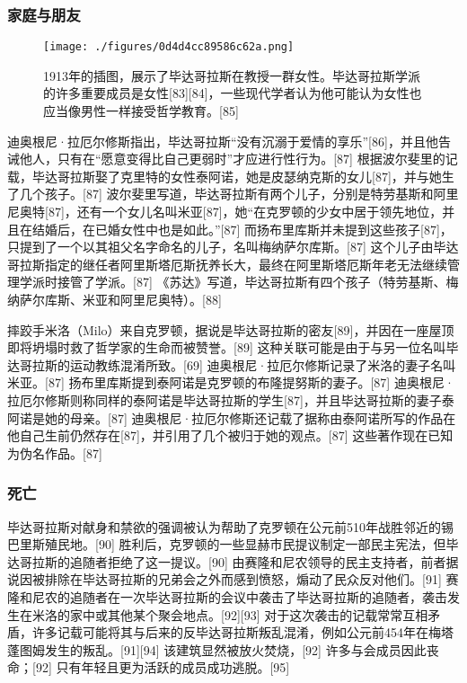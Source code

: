 \subsubsection{家庭与朋友}
\begin{figure}[ht]
\centering
\texttt{[image: ./figures/0d4d4cc89586c62a.png]}
\caption{1913年的插图，展示了毕达哥拉斯在教授一群女性。毕达哥拉斯学派的许多重要成员是女性[83][84]，一些现代学者认为他可能认为女性也应当像男性一样接受哲学教育。[85]} \label{fig_Pythag_6}
\end{figure}
迪奥根尼·拉厄尔修斯指出，毕达哥拉斯“没有沉溺于爱情的享乐”[86]，并且他告诫他人，只有在“愿意变得比自己更弱时”才应进行性行为。[87] 根据波尔斐里的记载，毕达哥拉斯娶了克里特的女性泰阿诺，她是皮瑟纳克斯的女儿[87]，并与她生了几个孩子。[87] 波尔斐里写道，毕达哥拉斯有两个儿子，分别是特劳基斯和阿里尼奥特[87]，还有一个女儿名叫米亚[87]，她“在克罗顿的少女中居于领先地位，并且在结婚后，在已婚女性中也是如此。”[87] 而扬布里库斯并未提到这些孩子[87]，只提到了一个以其祖父名字命名的儿子，名叫梅纳萨尔库斯。[87] 这个儿子由毕达哥拉斯指定的继任者阿里斯塔厄斯抚养长大，最终在阿里斯塔厄斯年老无法继续管理学派时接管了学派。[87] 《苏达》写道，毕达哥拉斯有四个孩子（特劳基斯、梅纳萨尔库斯、米亚和阿里尼奥特）。[88]

摔跤手米洛（Milo）来自克罗顿，据说是毕达哥拉斯的密友[89]，并因在一座屋顶即将坍塌时救了哲学家的生命而被赞誉。[89] 这种关联可能是由于与另一位名叫毕达哥拉斯的运动教练混淆所致。[69] 迪奥根尼·拉厄尔修斯记录了米洛的妻子名叫米亚。[87] 扬布里库斯提到泰阿诺是克罗顿的布隆提努斯的妻子。[87] 迪奥根尼·拉厄尔修斯则称同样的泰阿诺是毕达哥拉斯的学生[87]，并且毕达哥拉斯的妻子泰阿诺是她的母亲。[87] 迪奥根尼·拉厄尔修斯还记载了据称由泰阿诺所写的作品在他自己生前仍然存在[87]，并引用了几个被归于她的观点。[87] 这些著作现在已知为伪名作品。[87]
\subsubsection{死亡}  
毕达哥拉斯对献身和禁欲的强调被认为帮助了克罗顿在公元前510年战胜邻近的锡巴里斯殖民地。[90] 胜利后，克罗顿的一些显赫市民提议制定一部民主宪法，但毕达哥拉斯的追随者拒绝了这一提议。[90] 由赛隆和尼农领导的民主支持者，前者据说因被排除在毕达哥拉斯的兄弟会之外而感到愤怒，煽动了民众反对他们。[91] 赛隆和尼农的追随者在一次毕达哥拉斯的会议中袭击了毕达哥拉斯的追随者，袭击发生在米洛的家中或其他某个聚会地点。[92][93] 对于这次袭击的记载常常互相矛盾，许多记载可能将其与后来的反毕达哥拉斯叛乱混淆，例如公元前454年在梅塔蓬图姆发生的叛乱。[91][94] 该建筑显然被放火焚烧，[92] 许多与会成员因此丧命；[92] 只有年轻且更为活跃的成员成功逃脱。[95]

